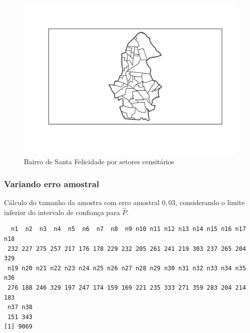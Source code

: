\documentclass[12pt]{article}\usepackage[]{graphicx}\usepackage[]{color}
\makeatletter
\newenvironment{kframe}{%
 \def\at@end@of@kframe{}%
 \ifinner\ifhmode%
  \def\at@end@of@kframe{\end{minipage}}%
  \begin{minipage}{\columnwidth}%
 \fi\fi%
 \def\FrameCommand##1{\hskip\@totalleftmargin \hskip-\fboxsep
 \colorbox{shadecolor}{##1}\hskip-\fboxsep
     \hskip-\linewidth \hskip-\@totalleftmargin \hskip\columnwidth}%
 \MakeFramed {\advance\hsize-\width
   \@totalleftmargin\z@ \linewidth\hsize
   \@setminipage}}%
 {\par\unskip\endMakeFramed%
 \at@end@of@kframe}
\newenvironment{knitrout}{}{} %
\makeatother
\begin{document}
\begin{knitrout}\footnotesize
{}\color{fgcolor}\begin{figure}[H]

{\centering \includegraphics[width=1\linewidth]{figure/plot1-1} 

}

\caption[Bairro de Santa Felicidade 
 por setores censitários]{Bairro de Santa Felicidade 
 por setores censitários}\label{fig:plot1}
\end{figure}


\end{knitrout}
\indent



\subsubsection{Variando erro amostral}
\indent

Cálculo do tamanho da amostra com erro amostral $0,03$, considerando o limite
inferior do intervalo de confiança para $\hat{P}$.
\indent





\begin{knitrout}\footnotesize
{}\color{fgcolor}\begin{kframe}
\begin{verbatim}
  n1  n2  n3  n4  n5  n6  n7  n8  n9 n10 n11 n12 n13 n14 n15 n16 n17 n18
 232 227 275 257 217 176 178 229 232 205 261 241 219 303 237 265 204 329
 n19 n20 n21 n22 n23 n24 n25 n26 n27 n28 n29 n30 n31 n32 n33 n34 n35 n36
 276 188 246 329 197 247 174 159 169 221 235 333 271 359 283 204 214 183
 n37 n38
 151 343
[1] 9069
\end{verbatim}
\end{kframe}
\end{knitrout}
\end{document}
